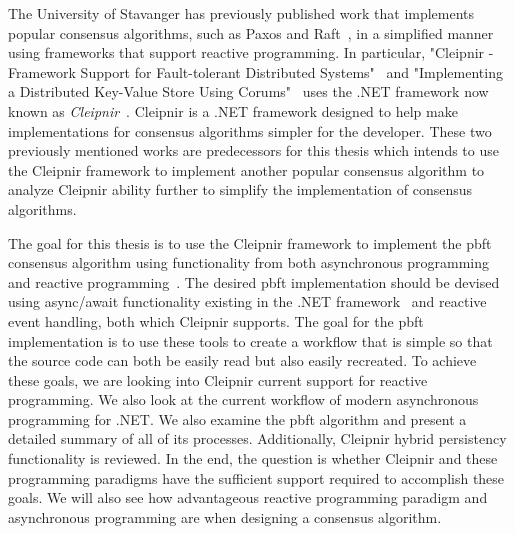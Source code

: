 The University of Stavanger has previously published work that implements popular consensus algorithms, such as Paxos and Raft~\cite{WEB:ConsesAlgo}, in a simplified manner using frameworks that support reactive programming. In particular, "Cleipnir - Framework Support for Fault-tolerant Distributed Systems"~\cite{PAPER:PaxosCleipnir} and "Implementing a Distributed Key-Value Store Using Corums"~\cite{PAPER:EivindPaper} uses the .NET framework now known as \textit{Cleipnir}~\cite{DOC:Cleipnir}.
Cleipnir is a .NET framework designed to help make implementations for consensus algorithms simpler for the developer.
These two previously mentioned works are predecessors for this thesis which intends to use the Cleipnir framework to implement another popular consensus algorithm to analyze Cleipnir ability further to simplify the implementation of consensus algorithms.

The goal for this thesis is to use the Cleipnir framework to implement the \acl{pbft} consensus algorithm using functionality from both asynchronous programming and reactive programming~\cite{WEB:pbftmast}. The desired \ac{pbft} implementation should be devised using async/await functionality existing in the .NET framework~\cite{DOC:AsyncAwait} and reactive event handling, both which Cleipnir supports. The goal for the \ac{pbft} implementation is to use these tools to create a workflow that is simple so that the source code can both be easily read but also easily recreated. To achieve these goals, we are looking into Cleipnir current support for reactive programming. We also look at the current workflow of modern asynchronous programming for .NET. We also examine the \ac{pbft} algorithm and present a detailed summary of all of its processes. Additionally, Cleipnir hybrid persistency functionality is reviewed.
In the end, the question is whether Cleipnir and these programming paradigms have the sufficient support required to accomplish these goals. We will also see how advantageous reactive programming paradigm and asynchronous programming are when designing a consensus algorithm.

